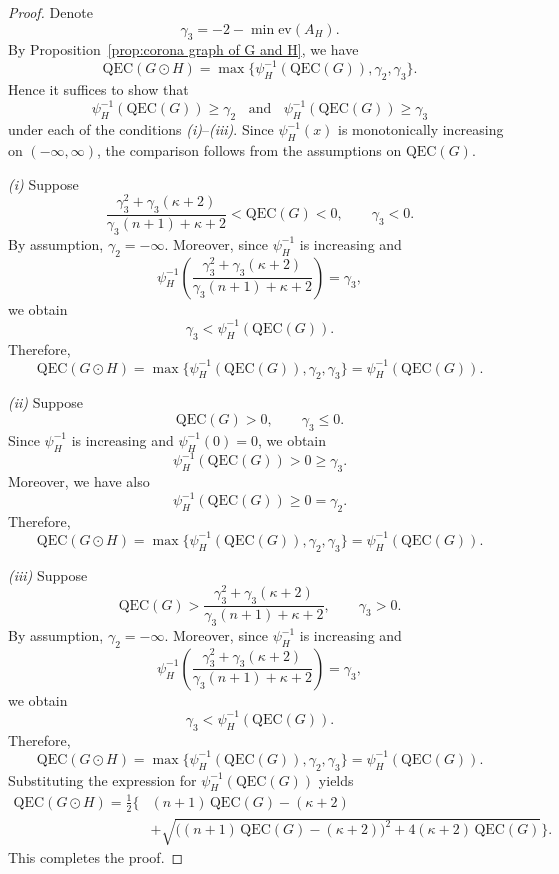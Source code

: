 \documentclass[pdflatex,sn-mathphys-num]{sn-jnl}
\theoremstyle{thmstyleone}%
\theoremstyle{thmstyletwo}%
\theoremstyle{thmstylethree}%
\begin{document}
\begin{proof}
Denote
\[
\gamma_3 = -2 - \min \mathrm{ev}(A_H).
\]
By Proposition~\ref{prop:corona graph of G and H}, we have
\[
\mathrm{QEC}(G \odot H)
=
\max\{\psi_{H}^{-1}(\mathrm{QEC}(G)),\gamma_2,\gamma_3\}.
\]
Hence it suffices to show that
\[
\psi_{H}^{-1}(\mathrm{QEC}(G)) \ge \gamma_2\;\; \text{ and }\;\; \psi_{H}^{-1}(\mathrm{QEC}(G)) \ge \gamma_3
\]
under each of the conditions \textit{(i)}--\textit{(iii)}. Since $\psi_{H}^{-1}(x)$ is monotonically increasing on $(-\infty,\infty)$, the comparison follows from the assumptions on $\mathrm{QEC}(G)$.

\medskip
\noindent
\textit{(i)} Suppose
\[
\frac{\gamma_3^2 + \gamma_3(\kappa+2)}
{\gamma_3(n+1)+\kappa+2}
< \mathrm{QEC}(G) < 0,
\qquad \gamma_3 < 0.
\]
By assumption, $\gamma_2=-\infty$. Moreover, since $\psi_H^{-1}$ is increasing and
\[
\psi_H^{-1}\!\left(
\frac{\gamma_3^2 + \gamma_3(\kappa+2)}
{\gamma_3(n+1)+\kappa+2}
\right)
= \gamma_3,
\]
we obtain
\[
\gamma_3
<
\psi_H^{-1}(\mathrm{QEC}(G)).
\]
Therefore,
\[
\mathrm{QEC}(G \odot H)
=
\max\{\psi_H^{-1}(\mathrm{QEC}(G)),\gamma_2,\gamma_3\}
=
\psi_H^{-1}(\mathrm{QEC}(G)).
\]

\medskip
\noindent
\textit{(ii)} Suppose
\[
\mathrm{QEC}(G) > 0,
\qquad \gamma_3 \le 0.
\]
Since $\psi_H^{-1}$ is increasing and $\psi_H^{-1}(0)=0$, we obtain
\[
\psi_H^{-1}(\mathrm{QEC}(G)) > 0 \ge \gamma_3.
\]
Moreover, we have also
\[\psi_H^{-1}(\mathrm{QEC}(G)) \ge 0 =\gamma_2.\]
Therefore,
\[
\mathrm{QEC}(G \odot H)
=
\max\{\psi_H^{-1}(\mathrm{QEC}(G)),\gamma_2,\gamma_3\}
=
\psi_H^{-1}(\mathrm{QEC}(G)).
\]

\medskip
\noindent
\textit{(iii)} Suppose
\[
\mathrm{QEC}(G) >
\frac{\gamma_3^2 + \gamma_3(\kappa+2)}
{\gamma_3(n+1)+\kappa+2},
\qquad \gamma_3 > 0.
\]
By assumption, $\gamma_2=-\infty$. Moreover, since $\psi_H^{-1}$ is increasing and
\[
\psi_H^{-1}\!\left(
\frac{\gamma_3^2 + \gamma_3(\kappa+2)}
{\gamma_3(n+1)+\kappa+2}
\right)
= \gamma_3,
\]
we obtain
\[
\gamma_3
<
\psi_H^{-1}(\mathrm{QEC}(G)).
\]
Therefore,
\[
\mathrm{QEC}(G \odot H)
=
\max\{\psi_H^{-1}(\mathrm{QEC}(G)), \gamma_2,\gamma_3\}
=
\psi_H^{-1}(\mathrm{QEC}(G)).
\]
Substituting the expression for $\psi_H^{-1}(\mathrm{QEC}(G))$ yields
\begin{align*}
\mathrm{QEC}(G \odot H) 
= \frac{1}{2} \bigg\{ 
&(n+1)\,\mathrm{QEC}(G) - (\kappa+2) \\
&+ \sqrt{\big((n+1)\,\mathrm{QEC}(G) - (\kappa+2)\big)^2 
+ 4(\kappa+2)\,\mathrm{QEC}(G)} 
\bigg\}.
\end{align*}
This completes the proof.
\end{proof}
\end{document}
